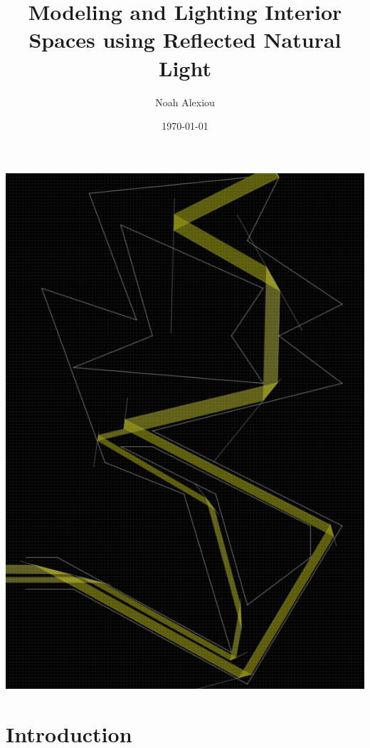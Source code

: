 \documentclass[11pt, letterpaper]{article}
\begin{document}
\begin{titlepage}
	\title{Modeling and Lighting Interior Spaces using Reflected Natural Light}
	\author{Noah Alexiou}
	\date{\today}
	
	\maketitle
	\centering
	\includegraphics[width=14cm]{Images/cave2.png}
	
\end{titlepage}

\newpage
\tableofcontents


\newpage

\section{Introduction}
\end{document}
